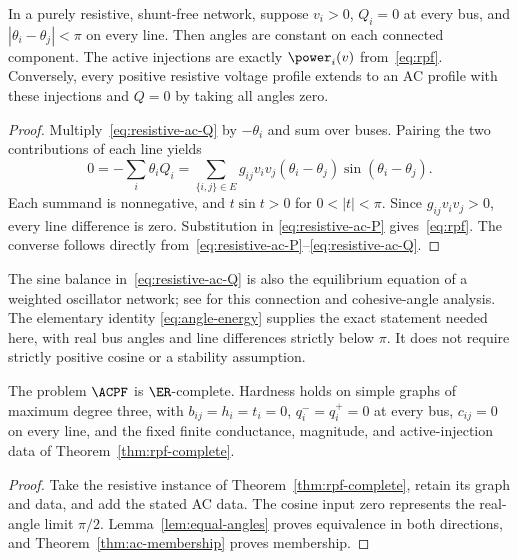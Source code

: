 \begin{lemma}
\label{lem:equal-angles}
In a purely resistive, shunt-free network, suppose $v_i>0$, $Q_i=0$ at
every bus, and $|\theta_i-\theta_j|<\pi$ on every line. Then angles are
constant on each connected component. The active injections are exactly
$\power_i(v)$ from~\eqref{eq:rpf}. Conversely, every positive resistive
voltage profile extends to an AC profile with these injections and $Q=0$
by taking all angles zero.
\end{lemma}
\begin{proof}
Multiply~\eqref{eq:resistive-ac-Q} by $-\theta_i$ and sum over buses.
Pairing the two contributions of each line yields
\begin{equation}
 0=-\sum_i\theta_i Q_i
 =\sum_{\{i,j\}\in E}g_{ij}v_iv_j
 (\theta_i-\theta_j)\sin(\theta_i-\theta_j).
 \label{eq:angle-energy}
\end{equation}
Each summand is nonnegative, and $t\sin t>0$ for $0<|t|<\pi$.
Since $g_{ij}v_iv_j>0$, every line difference is zero. Substitution in
\eqref{eq:resistive-ac-P} gives~\eqref{eq:rpf}. The converse follows directly
from~\eqref{eq:resistive-ac-P}--\eqref{eq:resistive-ac-Q}.
\end{proof}

The sine balance in~\eqref{eq:resistive-ac-Q} is also the equilibrium equation
of a weighted oscillator network; see \citet{DorflerEtAl2013} for this
connection and cohesive-angle analysis. The elementary identity
\eqref{eq:angle-energy} supplies the exact statement needed here, with real
bus angles and line differences strictly below $\pi$. It does not require
strictly positive cosine or a stability assumption.

\begin{theorem}
\label{thm:ac-complete}
The problem $\ACPF$ is $\ER$-complete. Hardness holds on simple graphs of
maximum degree three, with $b_{ij}=h_i=t_i=0$, $q_i^-=q_i^+=0$ at every bus,
$c_{ij}=0$ on every line, and the fixed finite conductance, magnitude, and
active-injection data of Theorem~\ref{thm:rpf-complete}.
\end{theorem}
\begin{proof}
Take the resistive instance of Theorem~\ref{thm:rpf-complete}, retain its
graph and data, and add the stated AC data. The cosine input zero represents
the real-angle limit $\pi/2$. Lemma~\ref{lem:equal-angles} proves equivalence
in both directions, and Theorem~\ref{thm:ac-membership} proves membership.
\end{proof}

